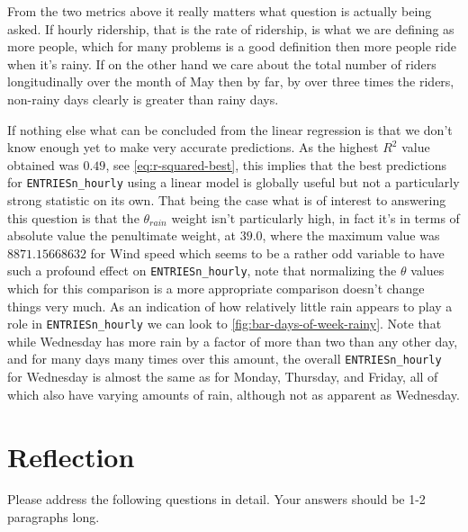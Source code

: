 \documentclass{article}
\numberwithin{questionCtr}{section}
\numberwithin{problemCtr}{section}
\begin{document}
From the two metrics above it really matters what question is actually being
asked.  If hourly ridership, that is the rate of ridership, is what we are
defining as more people, which for many problems is a good definition then more
people ride when it's rainy.  If on the other hand we care about the total
number of riders longitudinally over the month of May then by far, by over three
times the riders, non-rainy days clearly is greater than rainy days.  

If nothing else what can be concluded from the linear regression is that we
don't know enough yet to make very accurate predictions.  As the highest
$R^2$ value obtained was $0.49$, see \autoref{eq:r-squared-best}, this implies
that the best predictions for \verb|ENTRIESn_hourly| using a linear model is
globally useful but not a particularly strong statistic on its own.  That being
the case what is of interest to answering this question is that the
$\theta_{rain}$ weight isn't particularly high, in fact it's in terms of
absolute value the penultimate weight, at $39.0$, where the maximum value was
$8871.15668632$ for Wind speed which seems to be a rather odd variable to have
such a profound effect on \verb|ENTRIESn_hourly|, note that normalizing the
$\theta$ values which for this comparison is a more appropriate comparison
doesn't change things very much.  As an indication of how
relatively little rain appears to play a role in \verb|ENTRIESn_hourly| we can
look to \autoref{fig:bar-days-of-week-rainy}.  Note that while Wednesday has
more rain by a factor of more than two than any other day, and for many days
many times over this amount, the overall \verb|ENTRIESn_hourly| for Wednesday is
almost the same as for Monday, Thursday, and Friday, all of which also have varying
amounts of rain, although not as apparent as Wednesday.

\section{Reflection}
Please address the following questions in detail. Your answers should be 1-2
paragraphs long.
\end{document}
